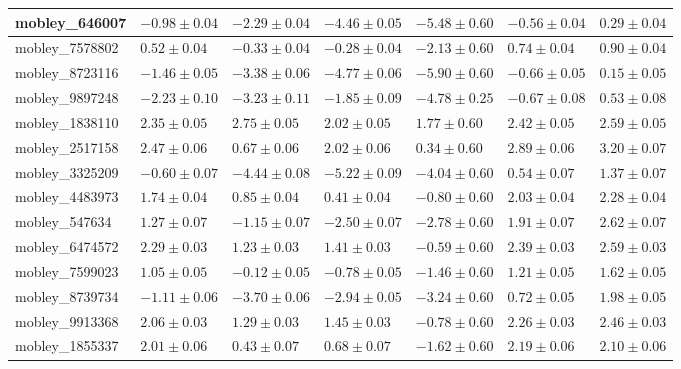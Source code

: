 \documentclass{article}
\begin{document}
\begin{landscape}
\begin{longtable}{|l{3.0cm}|l{3.0cm}|l{3.2cm}|l{3.6cm}|l{3.0cm}|l{3.0cm}|l{3.0cm}|}
mobley\_646007	&	$	-0.98	\pm	0.04	$	&	$	-2.29	\pm	0.04	$	&	$	-4.46	\pm	0.05	$	&	$	-5.48	\pm	0.60	$	&	$	-0.56	\pm	0.04	$	&	$	0.29	\pm	0.04	$	\\ \hline
mobley\_7578802	&	$	0.52	\pm	0.04	$	&	$	-0.33	\pm	0.04	$	&	$	-0.28	\pm	0.04	$	&	$	-2.13	\pm	0.60	$	&	$	0.74	\pm	0.04	$	&	$	0.90	\pm	0.04	$	\\ \hline
mobley\_8723116	&	$	-1.46	\pm	0.05	$	&	$	-3.38	\pm	0.06	$	&	$	-4.77	\pm	0.06	$	&	$	-5.90	\pm	0.60	$	&	$	-0.66	\pm	0.05	$	&	$	0.15	\pm	0.05	$	\\ \hline
mobley\_9897248	&	$	-2.23	\pm	0.10	$	&	$	-3.23	\pm	0.11	$	&	$	-1.85	\pm	0.09	$	&	$	-4.78	\pm	0.25	$	&	$	-0.67	\pm	0.08	$	&	$	0.53	\pm	0.08	$	\\ \hline
mobley\_1838110	&	$	2.35	\pm	0.05	$	&	$	2.75	\pm	0.05	$	&	$	2.02	\pm	0.05	$	&	$	1.77	\pm	0.60	$	&	$	2.42	\pm	0.05	$	&	$	2.59	\pm	0.05	$	\\ \hline
mobley\_2517158	&	$	2.47	\pm	0.06	$	&	$	0.67	\pm	0.06	$	&	$	2.02	\pm	0.06	$	&	$	0.34	\pm	0.60	$	&	$	2.89	\pm	0.06	$	&	$	3.20	\pm	0.07	$	\\ \hline
mobley\_3325209	&	$	-0.60	\pm	0.07	$	&	$	-4.44	\pm	0.08	$	&	$	-5.22	\pm	0.09	$	&	$	-4.04	\pm	0.60	$	&	$	0.54	\pm	0.07	$	&	$	1.37	\pm	0.07	$	\\ \hline
mobley\_4483973	&	$	1.74	\pm	0.04	$	&	$	0.85	\pm	0.04	$	&	$	0.41	\pm	0.04	$	&	$	-0.80	\pm	0.60	$	&	$	2.03	\pm	0.04	$	&	$	2.28	\pm	0.04	$	\\ \hline
mobley\_547634	&	$	1.27	\pm	0.07	$	&	$	-1.15	\pm	0.07	$	&	$	-2.50	\pm	0.07	$	&	$	-2.78	\pm	0.60	$	&	$	1.91	\pm	0.07	$	&	$	2.62	\pm	0.07	$	\\ \hline
mobley\_6474572	&	$	2.29	\pm	0.03	$	&	$	1.23	\pm	0.03	$	&	$	1.41	\pm	0.03	$	&	$	-0.59	\pm	0.60	$	&	$	2.39	\pm	0.03	$	&	$	2.59	\pm	0.03	$	\\ \hline
mobley\_7599023	&	$	1.05	\pm	0.05	$	&	$	-0.12	\pm	0.05	$	&	$	-0.78	\pm	0.05	$	&	$	-1.46	\pm	0.60	$	&	$	1.21	\pm	0.05	$	&	$	1.62	\pm	0.05	$	\\ \hline
mobley\_8739734	&	$	-1.11	\pm	0.06	$	&	$	-3.70	\pm	0.06	$	&	$	-2.94	\pm	0.05	$	&	$	-3.24	\pm	0.60	$	&	$	0.72	\pm	0.05	$	&	$	1.98	\pm	0.05	$	\\ \hline
mobley\_9913368	&	$	2.06	\pm	0.03	$	&	$	1.29	\pm	0.03	$	&	$	1.45	\pm	0.03	$	&	$	-0.78	\pm	0.60	$	&	$	2.26	\pm	0.03	$	&	$	2.46	\pm	0.03	$	\\ \hline
mobley\_1855337	&	$	2.01	\pm	0.06	$	&	$	0.43	\pm	0.07	$	&	$	0.68	\pm	0.07	$	&	$	-1.62	\pm	0.60	$	&	$	2.19	\pm	0.06	$	&	$	2.10	\pm	0.06	$	\\ \hline

\end{longtable}
\end{landscape}
\end{document}
